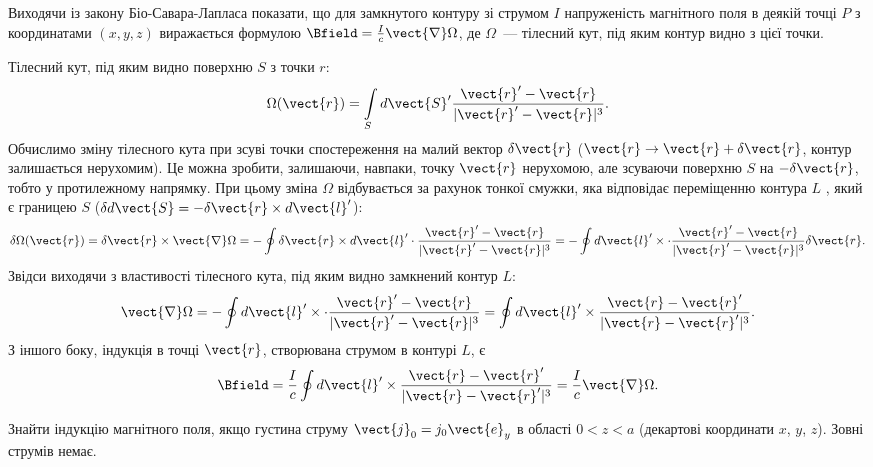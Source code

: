 
\begin{problem}
Виходячи із закону Біо-Савара-Лапласа показати, що для замкнутого контуру зі струмом $I$ напруженість магнітного поля в деякій точці $P$ з координатами $(x,y,z)$ виражається формулою $\Bfield = \frac{I}{c} \vect{\nabla}\Omega$, де $\Omega$~--- тілесний кут, під яким контур видно з цієї точки.
\begin{solution}
    Тілесний кут, під яким видно поверхню $S$ з точки $r$:
    \[
        \Omega(\vect{r}) = \int\limits_S d\vect{S}'\frac{\vect{r}' - \vect{r}}{|\vect{r}' - \vect{r}|^3}.
    \]
    Обчислимо зміну тілесного кута при зсуві точки спостереження на малий вектор $\delta\vect{r}$   ($\vect{r} \to \vect{r} + \delta\vect{r}$, контур залишається нерухомим). Це можна зробити, залишаючи, навпаки, точку $\vect{r}$  нерухомою, але зсуваючи поверхню $S$  на $-\delta\vect{r}$, тобто у протилежному напрямку. При цьому зміна $\Omega$ відбувається за рахунок тонкої смужки, яка відповідає переміщенню контура $L$ , який є границею $S$ ($\delta d{\vect{S}} =  - \delta\vect{r} \times d{\vect{l}'}$):
    \[
        \delta\Omega(\vect{r}) = \delta\vect{r}\times \vect{\nabla}\Omega = -\oint \delta\vect{r}\times d\vect{l}' \cdot \frac{\vect{r}' - \vect{r}}{|\vect{r}' - \vect{r}|^3} = - \oint  d\vect{l}' \times \cdot \frac{\vect{r}' - \vect{r}}{|\vect{r}' - \vect{r}|^3} \delta\vect{r}.
    \]
    Звідси виходячи з властивості тілесного кута, під яким видно замкнений контур $L$:
	\[
		\vect{\nabla}\Omega = - \oint  d\vect{l}' \times \cdot \frac{\vect{r}' - \vect{r}}{|\vect{r}' - \vect{r}|^3} = \oint  d\vect{l}' \times  \frac{\vect{r} - \vect{r}'}{|\vect{r} - \vect{r}'|^3}.
	\]
    З іншого боку, індукція в точці $\vect{r}$, створювана струмом в контурі $L$, є
	\[
		\Bfield = \frac{I}{c} \oint  d\vect{l}' \times  \frac{\vect{r} - \vect{r}'}{|\vect{r} - \vect{r}'|^3} = \frac{I}{c} \vect{\nabla}\Omega.
	\]
\end{solution}
\end{problem}


\begin{problem}
Знайти індукцію магнітного поля, якщо густина струму $\vect{j}_0 = j_0\vect{e}_y$   в області  $0 < z < a$ (декартові координати $x$, $y$, $z$). Зовні струмів немає.
\end{problem}

